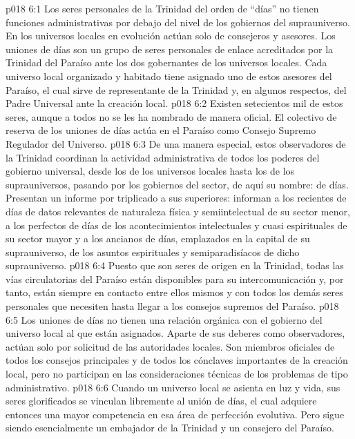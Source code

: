 \vs p018 6:1 Los seres personales de la Trinidad del orden de “días” no tienen funciones administrativas por debajo del nivel de los gobiernos del suprauniverso. En los universos locales en evolución actúan solo de consejeros y asesores. Los uniones de días son un grupo de seres personales de enlace acreditados por la Trinidad del Paraíso ante los dos gobernantes de los universos locales. Cada universo local organizado y habitado tiene asignado uno de estos asesores del Paraíso, el cual sirve de representante de la Trinidad y, en algunos respectos, del Padre Universal ante la creación local.
\vs p018 6:2 Existen setecientos mil de estos seres, aunque a todos no se les ha nombrado de manera oficial. El colectivo de reserva de los uniones de días actúa en el Paraíso como Consejo Supremo Regulador del Universo.
\vs p018 6:3 De una manera especial, estos observadores de la Trinidad coordinan la actividad administrativa de todos los poderes del gobierno universal, desde los de los universos locales hasta los de los suprauniversos, pasando por los gobiernos del sector, de aquí su nombre:  de días. Presentan un informe por triplicado a sus superiores: informan a los recientes de días de datos relevantes de naturaleza física y semiintelectual de su sector menor, a los perfectos de días de los acontecimientos intelectuales y cuasi espirituales de su sector mayor y a los ancianos de días, emplazados en la capital de su suprauniverso, de los asuntos espirituales y semiparadisíacos de dicho suprauniverso.
\vs p018 6:4 Puesto que son seres de origen en la Trinidad, todas las vías circulatorias del Paraíso están disponibles para su intercomunicación y, por tanto, están siempre en contacto entre ellos mismos y con todos los demás seres personales que necesiten hasta llegar a los consejos supremos del Paraíso.
\vs p018 6:5 \pc Los uniones de días no tienen una relación orgánica con el gobierno del universo local al que están asignados. Aparte de sus deberes como observadores, actúan solo por solicitud de las autoridades locales. Son miembros oficiales de todos los consejos principales y de todos los cónclaves importantes de la creación local, pero no participan en las consideraciones técnicas de los problemas de tipo administrativo.
\vs p018 6:6 Cuando un universo local se asienta en luz y vida, sus seres glorificados se vinculan libremente al unión de días, el cual adquiere entonces una mayor competencia en esa área de perfección evolutiva. Pero sigue siendo esencialmente un embajador de la Trinidad y un consejero del Paraíso.
